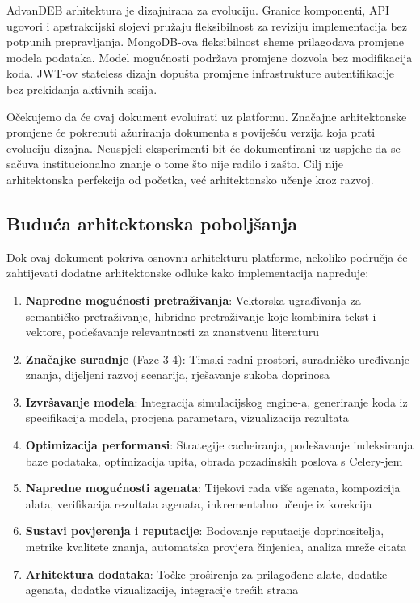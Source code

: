 \documentclass[12pt,a4paper]{article}
\begin{document}
AdvanDEB arhitektura je dizajnirana za evoluciju. Granice komponenti, API ugovori i apstrakcijski slojevi pružaju fleksibilnost za reviziju implementacija bez potpunih prepravljanja. MongoDB-ova fleksibilnost sheme prilagođava promjene modela podataka. Model mogućnosti podržava promjene dozvola bez modifikacija koda. JWT-ov stateless dizajn dopušta promjene infrastrukture autentifikacije bez prekidanja aktivnih sesija.

Očekujemo da će ovaj dokument evoluirati uz platformu. Značajne arhitektonske promjene će pokrenuti ažuriranja dokumenta s poviješću verzija koja prati evoluciju dizajna. Neuspjeli eksperimenti bit će dokumentirani uz uspjehe da se sačuva institucionalno znanje o tome što nije radilo i zašto. Cilj nije arhitektonska perfekcija od početka, već arhitektonsko učenje kroz razvoj.

\subsection{Buduća arhitektonska poboljšanja}

Dok ovaj dokument pokriva osnovnu arhitekturu platforme, nekoliko područja će zahtijevati dodatne arhitektonske odluke kako implementacija napreduje:

\begin{enumerate}
    \item \textbf{Napredne mogućnosti pretraživanja}: Vektorska ugrađivanja za semantičko pretraživanje, hibridno pretraživanje koje kombinira tekst i vektore, podešavanje relevantnosti za znanstvenu literaturu
    \item \textbf{Značajke suradnje} (Faze 3-4): Timski radni prostori, suradničko uređivanje znanja, dijeljeni razvoj scenarija, rješavanje sukoba doprinosa
    \item \textbf{Izvršavanje modela}: Integracija simulacijskog engine-a, generiranje koda iz specifikacija modela, procjena parametara, vizualizacija rezultata
    \item \textbf{Optimizacija performansi}: Strategije cacheiranja, podešavanje indeksiranja baze podataka, optimizacija upita, obrada pozadinskih poslova s Celery-jem
    \item \textbf{Napredne mogućnosti agenata}: Tijekovi rada više agenata, kompozicija alata, verifikacija rezultata agenata, inkrementalno učenje iz korekcija
    \item \textbf{Sustavi povjerenja i reputacije}: Bodovanje reputacije doprinositelja, metrike kvalitete znanja, automatska provjera činjenica, analiza mreže citata
    \item \textbf{Arhitektura dodataka}: Točke proširenja za prilagođene alate, dodatke agenata, dodatke vizualizacije, integracije trećih strana
\end{enumerate}
\end{document}
